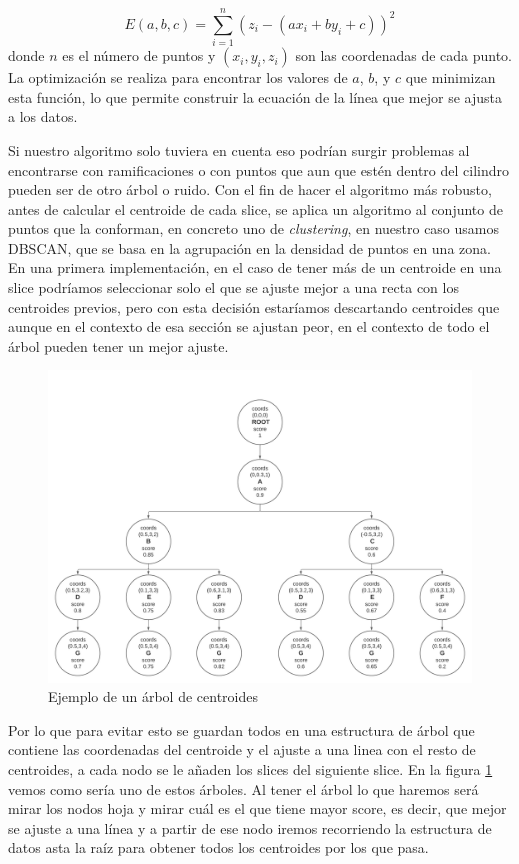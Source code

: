 \[
E(a, b, c) = \sum_{i=1}^{n} (z_i - (ax_i + by_i + c))^2
\]
donde $n$ es el número de puntos y $(x_i, y_i, z_i)$ son las coordenadas de cada punto. La optimización se realiza para encontrar los valores de $a$, $b$, y $c$ que minimizan esta función, lo que permite construir la ecuación de la línea que mejor se ajusta a los datos.

Si nuestro algoritmo solo tuviera en cuenta eso podrían surgir problemas al encontrarse con ramificaciones o con puntos que aun que estén dentro del cilindro pueden ser de otro árbol o ruido. 
Con el fin de hacer el algoritmo más robusto, antes de calcular el centroide de cada slice, se aplica un algoritmo al conjunto de puntos que la conforman, en concreto uno de \textit{clustering}, en nuestro caso usamos DBSCAN, que se basa en la agrupación en la densidad de puntos en una zona. En una primera implementación, en el caso de tener más de un centroide en una slice podríamos seleccionar solo el que se ajuste mejor a una recta con los centroides previos, pero con esta decisión estaríamos descartando centroides que aunque en el contexto de esa sección se ajustan peor, en el contexto de todo el árbol pueden tener un mejor ajuste.

\begin{figure}[h]
\centering
    \includegraphics[width=13cm]{imaxes/Diagrama_arb.png}
    \caption{Ejemplo de un árbol de centroides}
    \label{fig:diagFlujoarb}
\end{figure}

Por lo que para evitar esto se guardan todos en una estructura de árbol que contiene las coordenadas del centroide y el ajuste a una linea con el resto de centroides, a cada nodo se le añaden los slices del siguiente slice. 
En la figura \ref{fig:diagFlujoarb} vemos como sería uno de estos árboles. Al tener el árbol lo que haremos será mirar los nodos hoja y mirar cuál es el que tiene mayor score, es decir, que mejor se ajuste a una línea y a partir de ese nodo iremos recorriendo la estructura de datos asta la raíz para obtener todos los centroides por los que pasa.

